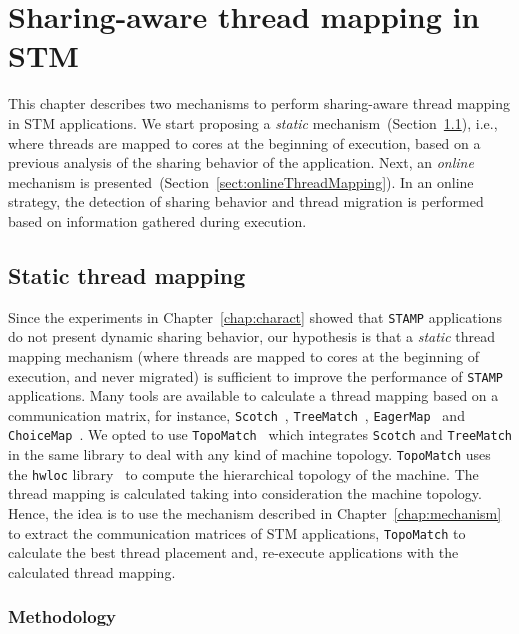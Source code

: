 \chapter{Sharing-aware thread mapping in STM}\label{chap:sharAwareThreadMap}

This chapter describes two mechanisms to perform sharing-aware thread mapping in STM applications. We start proposing a \emph{static} mechanism~(Section~\ref{sect:staticThreadMap}), i.e., where threads are mapped to cores at the beginning of execution, based on a previous analysis of the sharing behavior of the application. Next, an \emph{online} mechanism is presented~(Section~\ref{sect:onlineThreadMapping}). In an online strategy, the detection of sharing behavior and thread migration is performed based on information gathered during execution.

\section{Static thread mapping}\label{sect:staticThreadMap}

Since the experiments in Chapter~\ref{chap:charact} showed that \texttt{STAMP} applications do not present dynamic sharing behavior, our hypothesis is that a \emph{static} thread mapping mechanism (where threads are mapped to cores at the beginning of execution, and never migrated) is sufficient to improve the performance of \texttt{STAMP} applications. Many tools are available to calculate a thread mapping based on a communication matrix, for instance, \texttt{Scotch}~\cite{Pellegrini:1994}, \texttt{TreeMatch}~\cite{TreeMatch}, \texttt{EagerMap}~\cite{Cruz:2019}  and \texttt{ChoiceMap}~\cite{Soomro:2018}. We opted to use \texttt{TopoMatch}~\cite{TopoMatch} which integrates \texttt{Scotch} and \texttt{TreeMatch} in the same library to deal with any kind of machine topology. \texttt{TopoMatch} uses the \texttt{hwloc} library~\cite{hwloc} to compute the hierarchical topology of the machine. The thread mapping is calculated taking into consideration the machine topology. Hence, the idea is to use the mechanism described in Chapter~\ref{chap:mechanism} to extract the communication matrices of STM applications, \texttt{TopoMatch} to calculate the best thread placement and, re-execute applications with the calculated thread mapping.

\subsection{Methodology}\label{sect:threadMapMethodology}

